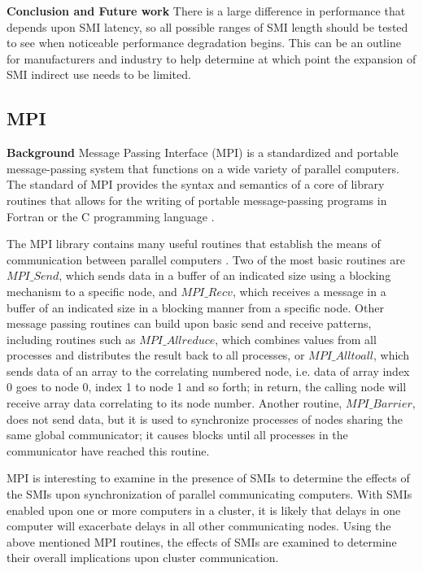 \documentclass{IEEEtran}
\begin{document}
\textbf{Conclusion and Future work}
There is a large difference in performance that depends upon SMI latency, so all possible ranges of SMI length should be tested to see when noticeable performance degradation begins. This can be an outline for manufacturers and industry to help determine at which point the expansion of SMI indirect use needs to be limited.\\


\subsection{MPI}
\textbf{Background}
Message Passing Interface (MPI) is a standardized and portable message-passing system that functions on a wide variety of parallel computers. The standard of MPI provides the syntax and semantics of a core of library routines that allows for the writing of portable message-passing programs in Fortran or the C programming language \emph{\cite{WK1}}.

The MPI library contains many useful routines that establish the means of communication between parallel computers \emph{\cite{MPICH}} . Two of the most basic routines are $MPI\_Send$, which sends data in a buffer of an indicated size using a blocking mechanism to a specific node, and $MPI\_Recv$, which receives a message in a buffer of an indicated size in a blocking manner from a specific node. Other message passing routines can build upon basic send and receive patterns, including routines such as $MPI\_Allreduce$, which combines values from all processes and distributes the result back to all processes, or $MPI\_Alltoall$, which sends data of an array to the correlating numbered node, i.e. data of array index 0 goes to node 0, index 1 to node 1 and so forth; in return, the calling node will receive array data correlating to its node number. Another routine, $MPI\_Barrier$, does not send data, but it is used to synchronize processes of nodes sharing the same global communicator; it causes blocks until all processes in the communicator have reached this routine. 

MPI is interesting to examine in the presence of SMIs to determine the effects of the SMIs upon synchronization of parallel communicating computers. With SMIs enabled upon one or more computers in a cluster, it is likely that delays in one computer will exacerbate delays in all other communicating nodes. Using the above mentioned MPI routines, the effects of SMIs are examined to determine their overall implications upon cluster communication.
\end{document}
